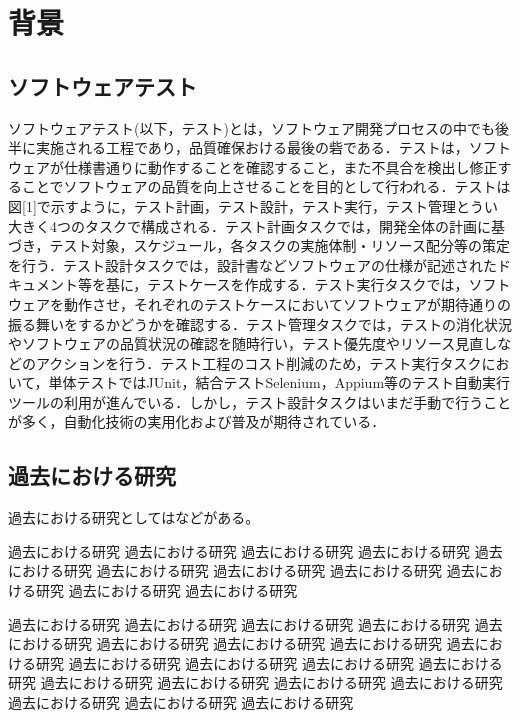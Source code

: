 \documentclass[12pt]{jarticle} %
\begin{document}

\newpage
\section{背景}
\subsection{ソフトウェアテスト}
ソフトウェアテスト(以下，テスト)とは，ソフトウェア開発プロセスの中でも後半に実施される工程であり，品質確保おける最後の砦である．テストは，ソフトウェアが仕様書通りに動作することを確認すること，また不具合を検出し修正することでソフトウェアの品質を向上させることを目的として行われる．テストは図[1]で示すように，テスト計画，テスト設計，テスト実行，テスト管理とうい大きく4つのタスクで構成される．テスト計画タスクでは，開発全体の計画に基づき，テスト対象，スケジュール，各タスクの実施体制・リソース配分等の策定を行う．テスト設計タスクでは，設計書などソフトウェアの仕様が記述されたドキュメント等を基に，テストケースを作成する．テスト実行タスクでは，ソフトウェアを動作させ，それぞれのテストケースにおいてソフトウェアが期待通りの振る舞いをするかどうかを確認する．テスト管理タスクでは，テストの消化状況やソフトウェアの品質状況の確認を随時行い，テスト優先度やリソース見直しなどのアクションを行う．テスト工程のコスト削減のため，テスト実行タスクにおいて，単体テストではJUnit，結合テストSelenium，Appium等のテスト自動実行ツールの利用が進んでいる．しかし，テスト設計タスクはいまだ手動で行うことが多く，自動化技術の実用化および普及が期待されている．








\subsection{過去における研究}
\label{kako}


過去における研究としては\cite{alex_nips12}などがある。

過去における研究 過去における研究 過去における研究 
過去における研究 過去における研究 過去における研究 過去における研究 
過去における研究 過去における研究 過去における研究 過去における研究 

過去における研究 過去における研究 過去における研究 過去における研究 
過去における研究 過去における研究 過去における研究 過去における研究 
過去における研究 過去における研究 過去における研究 過去における研究 
過去における研究 過去における研究 過去における研究 過去における研究 
過去における研究 過去における研究 過去における研究 過去における研究 
\end{document}
